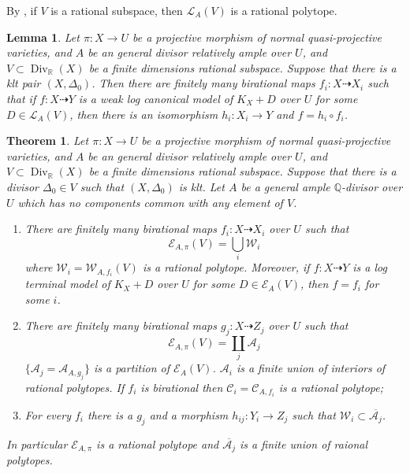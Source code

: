 \documentclass{article}
\newtheorem{lem}[defn]{Lemma}
\newtheorem{thm}[defn]{Theorem}
\begin{document}
By \cite[Lemma 3.7.2]{birkarExistenceMinimalModels2009}, if $V$  is a rational subspace, then $\mathcal{L}_{A}(V)$ is a rational polytope.
\begin{lem}\label{finitewlcm}
  \cite[Theorem E]{birkarExistenceMinimalModels2009} Let $\pi:X\to U$ be a projective morphism of normal quasi-projective varieties, and $A$ be an general divisor relatively ample over $U$, and $V \subset \operatorname{Div}_{\mathbb{R}}(X)$ be a finite dimensions rational subspace. Suppose that there is a klt pair $(X,\Delta_{0})$. Then there are finitely many birational maps $f_{i}:X \dashrightarrow X_{i}$ such that if $f:X \dashrightarrow  Y$ is a weak log canonical model of $K_{X}+D$ over $U$ for some $D \in \mathcal{L}_{A}(V)$, then there is an isomorphism  $h_{i}:X_{i} \to Y$  and $f=h_{i}\circ f_{i}$.  

\end{lem}

\begin{thm}\label{finitemodel}
\cite[Corollary 1.1.5]{birkarExistenceMinimalModels2009}Let $\pi:X\to U$ be a projective morphism of normal quasi-projective varieties, and $A$ be an general divisor relatively ample over $U$, and $V \subset \operatorname{Div}_{\mathbb{R}}(X)$ be a finite dimensions rational subspace. Suppose that there is a divisor $\Delta_{0} \in V$ such that $(X,\Delta_{0})$ is klt. Let $A$ be a general ample $\mathbb{Q}$-divisor over $U$ which has no components common with any element of $V$.  
  \begin{enumerate}
    \item   There are finitely many birational maps $f_{i}:X \dashrightarrow   X_{i}$ over $U$ such that 
      \[
        \mathcal{E}_{A,\pi}(V) =\bigcup_{i}\mathcal{W}_{i}
      \]
      where  $\mathcal{W}_{i}=\mathcal{W}_{A,f_{i}}(V)$ is a rational polytope. Moreover, if  $f:X \dashrightarrow  Y$ is a  log terminal model of $K_{X}+D$ over $U$ for some $D \in \mathcal{E}_{A}(V)$, then  $f=f_{i}$ for some $i$.  

    \item   There are finitely many birational maps $g_{j}:X \dashrightarrow  Z_{j}$ over $U$ such that
      \[
        \mathcal{E}_{A,\pi}(V) =\coprod_{j}\mathcal{A}_{j}
      \]
      $ \{\mathcal{A}_j=\mathcal{A}_{A,g_j}\} $ is a partition of $ \mathcal{E}_{A}(V) $. $ \mathcal{A}_i $ is a finite union of interiors of rational polytopes. If $ f_i $ is birational then $ \mathcal{C}_i=\mathcal{C}_{A,f_i} $ is a rational polytope;
      \item  For every  $f_{i}$ there is a $g_{j}$ and a morphism $h_{ij}:Y_{i}\to Z_{j}$ such that $\mathcal{W}_{i} \subset \overline{\mathcal{A}_{j}}$.   
  \end{enumerate}
  In particular $\mathcal{E}_{A,\pi}$ is a rational polytope and  $\overline{\mathcal{A}_{j}}$ is a finite union of raional polytopes. 
\end{thm}
\end{document}
